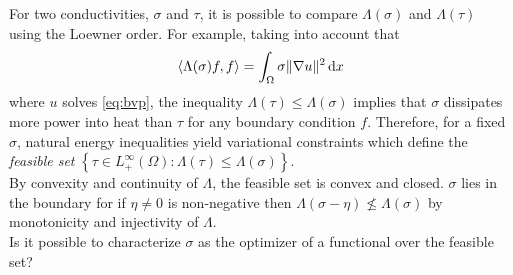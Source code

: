 \documentclass[a0paper, portrait]{tikzposter}
\renewcommand{\leq}{\leqslant}
\begin{document}
\begin{columns}
{
For two conductivities, $\sigma$ and $\tau$, it is possible to compare $\Lambda(\sigma)$ and $\Lambda(\tau)$ using the Loewner order.
For example, taking into account that
$$\langle\Lambda(\sigma)f,f\rangle = \int_\Omega \sigma \|\nabla u\|^2\,\text dx$$
where $u$ solves \eqref{eq:bvp}, the inequality $\Lambda(\tau)\leq\Lambda(\sigma)$ implies that $\sigma$ dissipates more power into heat than $\tau$ for any boundary condition $f$.
Therefore, for a fixed $\sigma$, natural energy inequalities yield variational constraints which define the \textit{feasible set} $\left\{\tau \in L^\infty_+(\Omega):\Lambda(\tau)\leq \Lambda(\sigma)\right\}$.\\[1em]
By convexity and continuity of $\Lambda$, the feasible set is convex and closed.
$\sigma$ lies in the boundary for if $\eta\neq0$ is non-negative then $\Lambda(\sigma-\eta) \not\leq \Lambda(\sigma)$ by monotonicity and injectivity of $\Lambda$.\\[1em]
Is it possible to characterize $\sigma$ as the optimizer of a functional over the feasible set? 
}


\end{columns}
\end{document}
